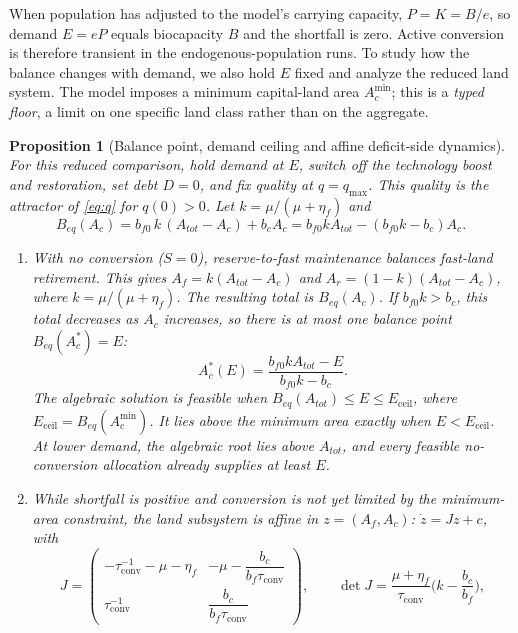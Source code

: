 \documentclass[preprint,12pt,authoryear]{elsarticle}
\newtheorem{proposition}{Proposition}
\newcommand{\Eceil}{E_{\mathrm{ceil}}}
\newcommand{\Acmin}{A_c^{\min}}
\newcommand{\tconv}{\tau_{\mathrm{conv}}}
\begin{document}
When population has adjusted to the model's carrying capacity, $P=K=B/e$, so demand $E=eP$ equals biocapacity $B$ and the shortfall is zero. Active conversion is therefore transient in the endogenous-population runs. To study how the balance changes with demand, we also hold $E$ fixed and analyze the reduced land system. The model imposes a minimum capital-land area $\Acmin$; this is a \emph{typed floor}, a limit on one specific land class rather than on the aggregate.

\begin{proposition}[Balance point, demand ceiling and affine deficit-side dynamics]\label{prop:ceiling}
For this reduced comparison, hold demand at $E$, switch off the technology boost and restoration, set debt $D=0$, and fix quality at $q=q_{\max}$. This quality is the attractor of \eqref{eq:q} for $q(0)>0$. Let $k=\mu/(\mu+\eta_f)$ and
\begin{equation}\label{eq:Beq}
B_{eq}(A_c)=b_{f0}\,k\,(A_{tot}-A_c)+b_cA_c=b_{f0}kA_{tot}-(b_{f0}k-b_c)A_c .
\end{equation}
\begin{enumerate}[label=(\roman*)]
\item With no conversion ($S=0$), reserve-to-fast maintenance balances fast-land retirement. This gives $A_f=k(A_{tot}-A_c)$ and $A_r=(1-k)(A_{tot}-A_c)$, where $k=\mu/(\mu+\eta_f)$. The resulting total is $B_{eq}(A_c)$. If $b_{f0}k>b_c$, this total decreases as $A_c$ increases, so there is at most one balance point $B_{eq}(A_c^*)=E$:
\begin{equation}\label{eq:Acstar}
A_c^*(E)=\frac{b_{f0}kA_{tot}-E}{b_{f0}k-b_c}.
\end{equation}
The algebraic solution is feasible when $B_{eq}(A_{tot})\le E\le\Eceil$, where $\Eceil=B_{eq}(\Acmin)$. It lies above the minimum area exactly when $E<\Eceil$. At lower demand, the algebraic root lies above $A_{tot}$, and every feasible no-conversion allocation already supplies at least $E$.
\item While shortfall is positive and conversion is not yet limited by the minimum-area constraint, the land subsystem is affine in $z=(A_f,A_c)$: $\dot z=Jz+c$, with
\begin{equation}\label{eq:J}
J=\begin{pmatrix}-\tconv^{-1}-\mu-\eta_f & -\mu-\dfrac{b_c}{b_f\tconv}\\[8pt] \tconv^{-1} & \dfrac{b_c}{b_f\tconv}\end{pmatrix},
\qquad \det J=\frac{\mu+\eta_f}{\tconv}\Big(k-\frac{b_c}{b_f}\Big),

\end{equation}
\end{enumerate}
\end{proposition}
\end{document}
